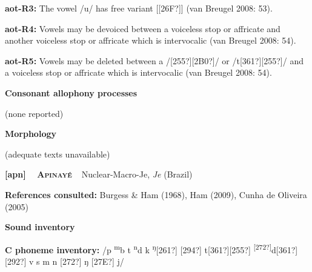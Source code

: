 \begin{styleBody}
\textbf{aot-R3: }The vowel /u/ has free variant [[26F?]] (van Breugel 2008: 53).
\end{styleBody}

\begin{styleBody}
\textbf{aot-R4: }Vowels may be devoiced between a voiceless stop or affricate and another voiceless stop or affricate which is intervocalic (van Breugel 2008: 54).
\end{styleBody}

\begin{styleBody}
\textbf{aot-R5: }Vowels may be deleted between a /[255?][2B0?]/ or /t[361?][255?]/ and a voiceless stop or affricate which is intervocalic (van Breugel 2008: 54).
\end{styleBody}

\begin{styleBody}
\textbf{Consonant allophony processes}
\end{styleBody}

\begin{styleBody}
(none reported)
\end{styleBody}

\begin{styleBody}
\textbf{Morphology}
\end{styleBody}

\begin{styleBody}
(adequate texts unavailable)
\end{styleBody}

\clearpage\begin{styleBody}
\textbf{[apn] }\ \ \textbf{\textsc{Apinayé}}\textbf{\ \ }Nuclear-Macro-Je, \textit{Je} (Brazil)
\end{styleBody}

\begin{styleBody}
\textbf{References consulted: }Burgess \& Ham (1968), Ham (2009), Cunha de Oliveira (2005)
\end{styleBody}

\begin{styleBody}
\textbf{Sound inventory}
\end{styleBody}

\begin{styleBody}
\textbf{C phoneme inventory:} /p \textsuperscript{m}b t \textsuperscript{n}d k \textsuperscript{ŋ}[261?] [294?] t[361?][255?] \textsuperscript{[272?]}d[361?][292?] v s m n [272?] ŋ [27E?] j/
\end{styleBody}

